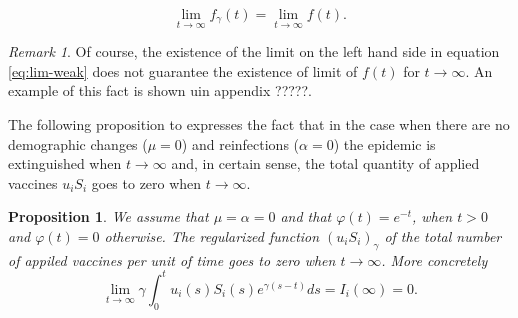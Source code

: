 \documentclass[a4paper,10pt]{article}
\newtheorem{prop}[thm]{Proposition}
\theoremstyle{remark}
\newtheorem{comentario}{Remark}
\begin{document}
 \begin{equation}\label{eq:lim-weak}
 \lim_{t\to\infty}f_\gamma(t) =\lim_{t\to\infty}f(t).
\end{equation}


\begin{comentario} Of course, the existence of the limit on the left hand side in equation \eqref{eq:lim-weak}   does not guarantee the existence of limit of $f(t)$ for $t\to\infty$. An example of this fact is shown uin appendix ?????.
\end{comentario}

The following proposition to expresses the fact that in the case when there are no demographic changes ($\mu=0$) and reinfections ($\alpha=0$) the  epidemic is extinguished when $t\to\infty$ and, in certain sense, the total quantity of applied vaccines $ u_iS_i$ goes to zero when $t\to\infty$.   

\begin{prop} We assume that $\mu=\alpha=0$ and  that $\varphi(t)=e^{-t}$, when $t>0$ and $\varphi(t)=0$ otherwise. The regularized function $(u_iS_i)_\gamma$ of the total number of appiled vaccines per unit of time goes to zero when $t\to\infty$. More concretely
\[
 \lim\limits_{t\to\infty}\gamma\int_0^t  u_i(s)S_i(s)
  e^{\gamma (s-t)}ds=I_i(\infty)=0.
\]

 
\end{prop}
\end{document}
